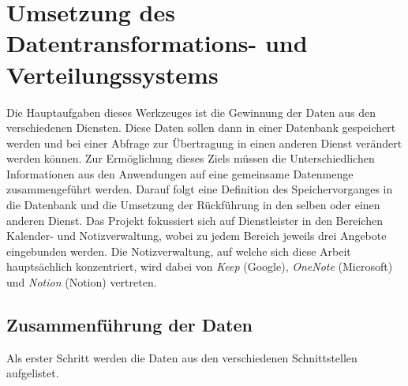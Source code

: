 \chapter{Umsetzung des Datentransformations- und Verteilungssystems}

Die Hauptaufgaben dieses Werkzeuges ist die Gewinnung der Daten aus den verschiedenen Diensten. Diese Daten sollen dann in einer Datenbank gespeichert werden und bei einer Abfrage zur Übertragung in einen anderen Dienst verändert werden können. Zur Ermöglichung dieses Ziels müssen die Unterschiedlichen Informationen aus den Anwendungen auf eine gemeinsame Datenmenge zusammengeführt werden. Darauf folgt eine Definition des Speichervorganges in die Datenbank und die Umsetzung der Rückführung in den selben oder einen anderen Dienst. Das Projekt fokussiert sich auf Dienstleister in den Bereichen Kalender- und Notizverwaltung, wobei zu jedem Bereich jeweils drei Angebote eingebunden werden. Die Notizverwaltung, auf welche sich diese Arbeit hauptsächlich konzentriert, wird dabei von \textit{Keep} (Google), \textit{OneNote} (Microsoft) und \textit{Notion} (Notion) vertreten.

\section{Zusammenführung der Daten}

Als erster Schritt werden die Daten aus den verschiedenen Schnittstellen aufgelistet. 